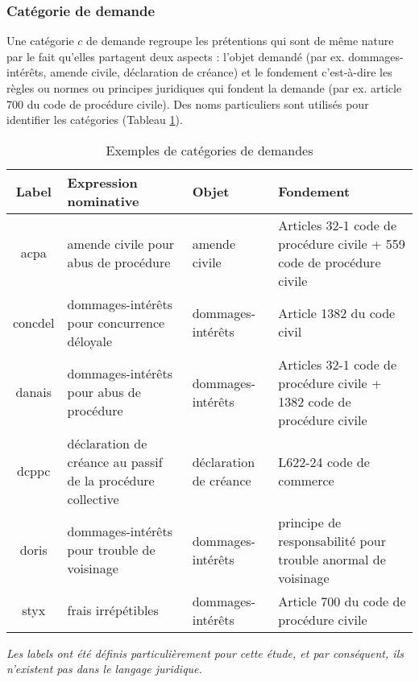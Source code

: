 \subsubsection{Catégorie de demande}

Une catégorie $c$ de demande regroupe les prétentions qui sont de même nature par le fait qu'elles partagent deux aspects : l'objet demandé (par ex. dommages-intérêts, amende civile, déclaration de créance) et le fondement c'est-à-dire les règles ou normes ou principes juridiques qui fondent la demande (par ex. article 700 du code de procédure civile). Des noms particuliers sont utilisés pour identifier les catégories (Tableau \ref{tab:quanta:exemple-categorie}).

\begin{table}[!htb]
\scriptsize
\begin{tabular}{|c|p{}|p{}|p{}|}
\hline
\textbf{Label} & \textbf{Expression nominative }                                     & \textbf{Objet}                                                       & \textbf{Fondement}                                                                 \\ \hline
acpa & amende civile pour abus de procédure                         & amende civile                                               & Articles 32-1 code de procédure civile + 559 code de procédure civile  \\ \hline
concdel & dommages-intérêts pour concurrence déloyale                  & dommages-intérêts                                           & Article 1382 du code civil                                             \\ \hline
danais & dommages-intérêts pour abus de procédure                   & dommages-intérêts                                           & Articles 32-1 code de procédure civile + 1382 code de procédure civile \\ \hline
dcppc & déclaration de créance au passif de la procédure collective  & déclaration de créance & L622-24 code de commerce                                               \\ \hline
doris & dommages-intérêts pour trouble de voisinage                  & dommages-intérêts                                           & principe de responsabilité pour trouble anormal de voisinage           \\ \hline
styx & frais irrépétibles                                          & dommages-intérêts                                           & Article 700 du code de procédure civile                                 \\ \hline
\end{tabular}
\textit{Les labels ont été définis particulièrement pour cette étude, et par conséquent, ils n'existent pas dans le langage juridique.}
\caption{Exemples de catégories de demandes}\label{tab:quanta:exemple-categorie}
\end{table}

